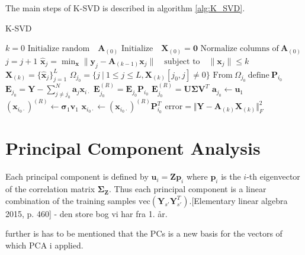 The main steps of K-SVD is described in algorithm \ref{alg:K_SVD}. 
\begin{algorithm}[H]
\caption{K-SVD}
\begin{algorithmic}[1]
			\State$k = 0$			
			\State$\text{Initialize random} \quad  \textbf{A}_{(0)}$            
			\State$\text{Initialize} \quad \textbf{X}_{(0)}=\mathbf{0}$
			\State
            \State$\text{Normalize columns of} \ \textbf{A}_{(0)}$
                \State $j = j+1$
                 
                	\State$\hat{\textbf{x}}_{j} = \min_{\textbf{x}} \|\textbf{y}_j -\textbf{A}_{(k-1)}\textbf{x}_{j}\| \quad \text{subject to} \quad \|\textbf{x}_{j}\| \leq k $ 
				\EndFor
				\State$\textbf{X}_{(k)} = \lbrace \hat{\textbf{x}}_{j} \rbrace_{j=1}^{L}$
					\State$\Omega_{j_0} = \lbrace j \ \vert \ 1 \leq j \leq L, \textbf{X}_{(k)} [j_0, j]\neq 0\rbrace$
					\State$\text{From} \ \Omega_{j_0} \ \text{define} \ \textbf{P}_{i_0} $
					\State$\textbf{E}_{j_0} =  \textbf{Y} - \sum_{j \neq j_{0}}^{N} \textbf{a}_j \textbf{x}_{i \cdot}$
					\State$\textbf{E}_{j_0}^{(R)} =  \textbf{E}_{j_0} \textbf{P}_{i_0}$
					\State$\textbf{E}_{j_0}^{(R)} =\textbf{U} \boldsymbol{\Sigma} \textbf{V}^T$ 
					\State$\textbf{a}_{j_0} \gets \textbf{u}_{1}$ 
					\State$\left( \textbf{x}_{i_0 \cdot} \right)^{(R)} \gets \boldsymbol{\sigma}_{1} \textbf{v}_{1}$
					\State$\textbf{x}_{i_0 \cdot} \gets \left( \textbf{x}_{i_0 \cdot} \right)^{(R)} \textbf{P}_{i_0}^T $ 
				\EndFor
				\State$\text{error} = \Vert \textbf{Y} - \textbf{A}_{(k)} \textbf{X}_{(k)} \Vert_{F}^2 $
          		\EndWhile
            \EndProcedure
        \end{algorithmic} 
        \label{alg:K_SVD}
\end{algorithm}

\section{Principal Component Analysis}\label{app_sec:PCA}
Each principal component is defined by $\textbf{u}_i = \textbf{Z}\textbf{p}_i$ where $\textbf{p}_i$ is the $i$-th eigenvector of the correlation matrix $\boldsymbol{\Sigma}_{\textbf{Z}}$. Thus each principal component is a linear combination of the training samples $\text{vec}\left( \mathbf{Y}_{s'} \mathbf{Y}_{s'}^T \right)$.[Elementary linear algebra 2015, p. 460] - den store bog vi har fra 1. år. 

further is has to be mentioned that the PCs is a new basis for the vectors of which PCA i applied. 
